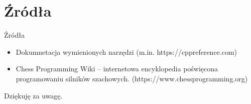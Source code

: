 \documentclass[aspectratio=1610, english]{beamer}
\begin{document}

\section{Źródła}
\begin{frame}{Źródła}
    \begin{itemize}
        \item Dokumnetacja wymienionych narzędzi (m.in. https://cppreference.com)
        \newline
        \item Chess Programming Wiki – internetowa encyklopedia poświęcona programowaniu silników szachowych. (https://www.chessprogramming.org)
    \end{itemize}
\end{frame}
\begin{frame}{}
    \centering
    \Huge Dziękuję za uwagę.
    \vspace{1cm}
\end{frame}
\end{document}
